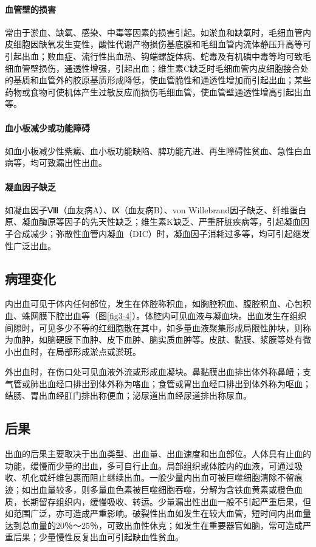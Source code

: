 \paragraph{血管壁的损害}
常由于淤血、缺氧、感染、中毒等因素的损害引起。如淤血和缺氧时，毛细血管内皮细胞因缺氧发生变性，酸性代谢产物损伤基底膜和毛细血管内流体静压升高等可引起出血；败血症、流行性出血热、钩端螺旋体病、蛇毒及有机磷中毒等均可致毛细血管壁损伤，通透性增强，引起出血；维生素C缺乏时毛细血管内皮细胞接合处的基质和血管外的胶原基质形成降低，使血管脆性和通透性增加而引起出血；某些药物或食物可使机体产生过敏反应而损伤毛细血管，使血管壁通透性增高引起出血等。

\paragraph{血小板减少或功能障碍}
如血小板减少性紫癜、血小板功能缺陷、脾功能亢进、再生障碍性贫血、急性白血病等，均可致漏出性出血。

\paragraph{凝血因子缺乏}
如凝血因子Ⅷ（血友病A）、Ⅸ（血友病B）、von
Willebrand因子缺乏、纤维蛋白原、凝血酶原等因子的先天性缺乏；维生素K缺乏、严重肝脏疾病等，引起凝血因子合成减少；弥散性血管内凝血（DIC）时，凝血因子消耗过多等，均可引起继发性广泛出血。

\subsection{病理变化}

内出血可见于体内任何部位，发生在体腔称积血，如胸腔积血、腹腔积血、心包积血、蛛网膜下腔出血等（图\ref{fig3-4}）。体腔内可见血液与凝血块。出血发生在组织间隙时，可见多少不等的红细胞散在其中，如多量血液聚集形成局限性肿块，则称为血肿，如脑硬膜下血肿、皮下血肿、脑实质血肿等。皮肤、黏膜、浆膜等处有微小出血时，在局部形成淤点或淤斑。

外出血时，在伤口处可见血液外流或形成血凝块。鼻黏膜出血排出体外称鼻衄；支气管或肺出血经口排出到体外称为咯血；食管或胃出血经口排出到体外称为呕血；结肠、胃出血经肛门排出称便血；泌尿道出血经尿道排出称尿血。

\subsection{后果}

出血的后果主要取决于出血类型、出血量、出血速度和出血部位。人体具有止血的功能，缓慢而少量的出血，多可自行止血。局部组织或体腔内的血液，可通过吸收、机化或纤维包裹而阻止继续出血。一般少量内出血可被巨噬细胞清除不留痕迹；如出血量较多，则多量血色素被巨噬细胞吞噬，分解为含铁血黄素或橙色血质，长期留存组织内，缓慢吸收、转运。少量漏出性出血一般不引起严重后果，但如范围广泛，亦可造成严重影响。破裂性出血如发生在较大血管，短时间内出血量达到总血量的20％～25％，可致出血性休克；如发生在重要器官如脑，常可造成严重后果；少量慢性反复出血可引起缺血性贫血。


